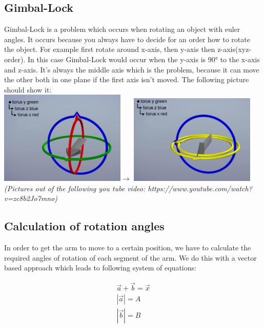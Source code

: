 \subsection{Gimbal-Lock}
Gimbal-Lock is a problem which occurs when rotating an object with euler angles. It occurs because you always have to decide for an order how to rotate the object. For example first rotate around x-axis, then y-axis then z-axis(xyz-order). In this case Gimbal-Lock would occur when the y-axis is 90° to the x-axis and z-axis. It's always the middle axis which is the problem, because it can move the other both in one plane if the first axis isn't moved. The following picture should show it:\\
\includegraphics[width=0.45\textwidth]{imgs/GimbalLock/GimbalLock1.png}$\rightarrow$
\includegraphics[width=0.45\textwidth]{imgs/GimbalLock/GimbalLock2.png}\\
\textit{(Pictures out of the following you tube video: https://www.youtube.com/watch?v=zc8b2Jo7mno)}

\subsection{Calculation of rotation angles}
In order to get the arm to move to a certain position, we have to calculate the required angles of rotation of each segment of the arm. We do this with a vector based approach which leads to following system of equations:

\begin{align*}
\vec{a}  + \vec{b} = \vec{x}\\
|\vec{a}| = A\\
|\vec{b}| = B
\end{align*}

